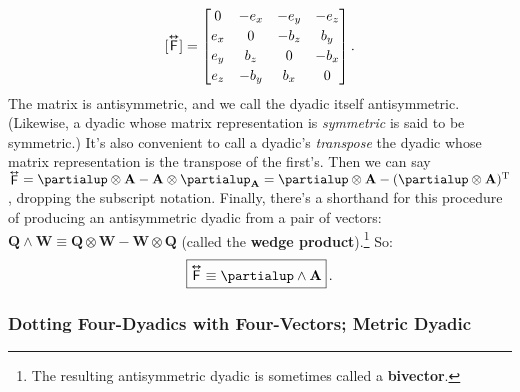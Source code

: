 \documentclass[12pt]{article}
\renewcommand{\vv}[1]{\mathbf{#1}}
\newcommand{\tightoverset}[2]{%
  \mathop{#2}\limits^{\vbox to -.5ex{\kern-0.75ex\hbox{$#1$}\vss}}}
\newcommand{\inlinedy}[1]{\tightoverset{\text{\tiny$\bm\leftrightarrow$}}{#1}}
\newcommand{\capdy}[1]{ \overset{ \text{\tiny$\bm\leftrightarrow$} }{\vphantom{\text{\small{A}}}\smash{#1}} }
\begin{document}
\begin{equation}\label{eq:emt}
[\capdy{\mathsf{F}}]
=
\begin{bmatrix}
0 & -e_x & -e_y & -e_z \\[.5ex]
e_x & 0 & -b_z & b_y \\[.5ex]
e_y & b_z & 0 & -b_x \\[.5ex]
e_z & -b_y & b_x & 0
\end{bmatrix} .
\end{equation}
The matrix is antisymmetric, and we call the dyadic itself antisymmetric. (Likewise, a dyadic whose matrix representation is \emph{symmetric} is said to be symmetric.) It's also convenient to call a dyadic's \emph{transpose} the dyadic whose matrix representation is the transpose of the first's. Then we can say ${\inlinedy{\mathsf{F}} = \partialup \otimes \vv A - \vv A \otimes \partialup_{\vv A} = \partialup \otimes \vv A - (\partialup \otimes \vv A)^\mathrm{T}}$, dropping the subscript notation. Finally, there's a shorthand for this procedure of producing an antisymmetric dyadic from a pair of vectors: $\vv Q \wedge \vv W \equiv \vv Q \otimes \vv W - \vv W \otimes \vv Q$ (called the \textbf{wedge product}).\footnote{The resulting antisymmetric dyadic is sometimes called a \textbf{bivector}.} So:
\begin{equation}\label{eq:emta}
\boxed{ \vphantom{A_{A_A}} \capdy{\mathsf{F}} \equiv \partialup \wedge \vv A } \, . 
\end{equation}

\subsubsection{Dotting Four-Dyadics with Four-Vectors; Metric Dyadic}
\end{document}
